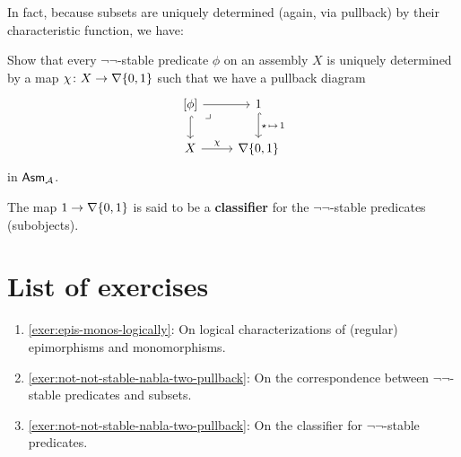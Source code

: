 In fact, because subsets are uniquely determined (again, via pullback) by their
characteristic function, we have:

\begin{exercise}\label{exer:not-not-stable-nabla-two-pullback}
  Show that every \(\lnot\lnot\)-stable predicate \(\phi\) on an assembly \(X\)
  is uniquely determined by a map \(\chi \colon X \to \nabla\{0,1\}\) such
  that we have a pullback diagram
  \[
    \begin{tikzcd}
      {[\phi]} \ar[r] \ar[d,hookrightarrow] \pbcorner
      & 1 \ar[d,hookrightarrow,"{\singleton \,\mapsto\, 1}"] \\
      X \ar[r,"\chi"] & \nabla\set{0,1}
    \end{tikzcd}
  \]
  in \(\mathsf{Asm}_{\mathcal A}\).
\end{exercise}

The map \(1 \to \nabla\{0,1\}\) is said to be a \textbf{classifier} for the
\(\lnot\lnot\)-stable predicates (subobjects).

\section{List of exercises}
\begin{enumerate}
\item \cref{exer:epis-monos-logically}: On logical characterizations of
  (regular) epimorphisms and monomorphisms.
\item \cref{exer:not-not-stable-nabla-two-pullback}: On the correspondence
  between \(\lnot\lnot\)-stable predicates and subsets.
\item \cref{exer:not-not-stable-nabla-two-pullback}: On the classifier for
  \(\lnot\lnot\)-stable predicates.
\end{enumerate}

